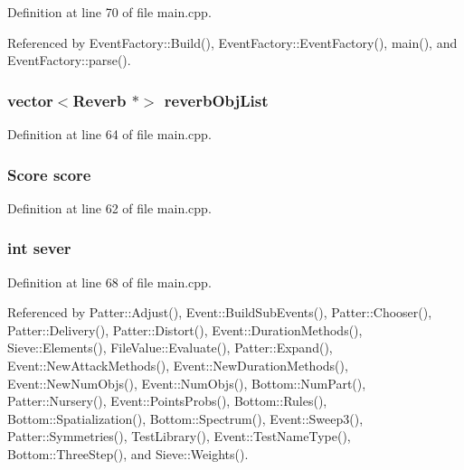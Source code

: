 Definition at line 70 of file main.cpp.

Referenced by Event\-Factory::Build(), Event\-Factory::Event\-Factory(), main(), and Event\-Factory::parse().
\subsubsection{\setlength{\rightskip}{0pt plus 5cm}vector$<$Reverb $\ast$$>$ {\bf reverb\-Obj\-List}}\label{main_8cpp_a3}




Definition at line 64 of file main.cpp.
\subsubsection{\setlength{\rightskip}{0pt plus 5cm}Score {\bf score}}\label{main_8cpp_a2}




Definition at line 62 of file main.cpp.
\subsubsection{\setlength{\rightskip}{0pt plus 5cm}int {\bf sever}}\label{main_8cpp_a7}




Definition at line 68 of file main.cpp.

Referenced by Patter::Adjust(), Event::Build\-Sub\-Events(), Patter::Chooser(), Patter::Delivery(), Patter::Distort(), Event::Duration\-Methods(), Sieve::Elements(), File\-Value::Evaluate(), Patter::Expand(), Event::New\-Attack\-Methods(), Event::New\-Duration\-Methods(), Event::New\-Num\-Objs(), Event::Num\-Objs(), Bottom::Num\-Part(), Patter::Nursery(), Event::Points\-Probs(), Bottom::Rules(), Bottom::Spatialization(), Bottom::Spectrum(), Event::Sweep3(), Patter::Symmetries(), Test\-Library(), Event::Test\-Name\-Type(), Bottom::Three\-Step(), and Sieve::Weights().